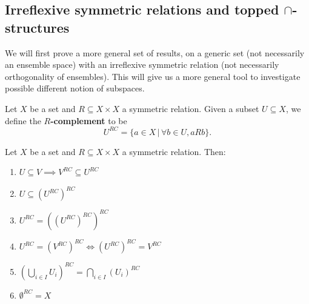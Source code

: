 \subsection{Irreflexive symmetric relations and topped $\cap$-structures}


We will first prove a more general set of results, on a generic set (not necessarily an ensemble space) with an irreflexive symmetric relation (not necessarily orthogonality of ensembles). This will give us a more general tool to investigate possible different notion of subspaces.

\begin{defn}
	Let $X$ be a set and $R \subseteq X \times X$ a symmetric relation. Given a subset $U \subseteq X$, we define the \textbf{$R$-complement} to be
	$$ U^{RC} = \{ a \in X \, | \, \forall b \in U, aRb  \}. $$
\end{defn}

\begin{prop}\label{pm_es_rComplProps}
	Let $X$ be a set and $R \subseteq X \times X$ a symmetric relation. Then:
	\begin{enumerate}
		\item $U \subseteq V \implies V^{RC} \subseteq U^{RC}$
		\item $U \subseteq (U^{RC})^{RC}$
		\item $U^{RC} = ((U^{RC})^{RC})^{RC}$
		\item $U^{RC} = (V^{RC})^{RC} \iff (U^{RC})^{RC} = V^{RC}$
		\item $(\bigcup_{i \in I} U_i )^{RC} = \bigcap_{i \in I} (U_i)^{RC}$
		\item $\emptyset^{RC} = X$
	\end{enumerate}
\end{prop}

